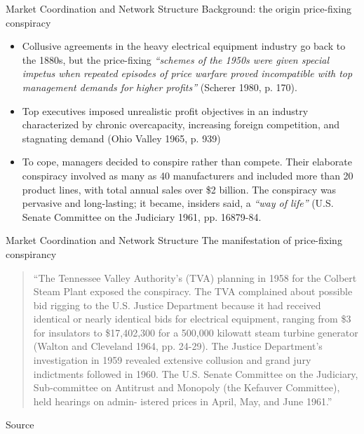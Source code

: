 \documentclass[aspectratio=1610]{beamer}
\begin{document}
\begin{frame}{Market Coordination and Network Structure}
	{Background: the origin price-fixing conspiracy}
	\small
	\begin{itemize}
		\item 
		Collusive agreements in the heavy electrical equipment industry go back 
		to the 1880s, but the price-fixing \textit{``schemes of the 1950s were given 
		special impetus when repeated episodes of price warfare proved 
		incompatible with top management demands for higher profits''} (Scherer 
		1980, p. 170).
	        \item 	
		Top executives imposed unrealistic profit objectives in an industry 
		characterized by chronic overcapacity, increasing foreign competition, 
		and stagnating demand (Ohio Valley 1965, p. 939)
		\item 
		To cope, managers 
		decided to conspire rather than compete. Their elaborate conspiracy 
		involved as many as 40 manufacturers and included more than 20 product 
		lines, with total annual sales over \$2 billion. The conspiracy was 
		pervasive and long-lasting; it became, insiders said, a \textit{``way of life''}
		(U.S. Senate Committee on the Judiciary 1961, pp. 16879-84.
	\end{itemize}
\end{frame}

\begin{frame}{Market Coordination and Network Structure}
	{The manifestation of price-fixing conspirancy}
	\begin{quote}
	``The Tennessee Valley Authority's (TVA) planning in 1958 for the
	Colbert Steam Plant exposed the conspiracy. The TVA complained about
	possible bid rigging to the U.S. Justice Department because it had
	received identical or nearly identical bids for electrical equipment,
	ranging from \$3 for insulators to \$17,402,300 for a 500,000 kilowatt
	steam turbine generator (Walton and Cleveland 1964, pp. 24-29). The
	Justice Department's investigation in 1959 revealed extensive
	collusion and grand jury indictments followed in 1960. The U.S. Senate
	Committee on the Judiciary, Sub-committee on Antitrust and Monopoly
	(the Kefauver Committee), held hearings on admin- istered prices in
	April, May, and June 1961.''
	\end{quote}
	
	Source~\cite[][page 838]{baker_faulkner_1993}
\end{frame}
\end{document}
